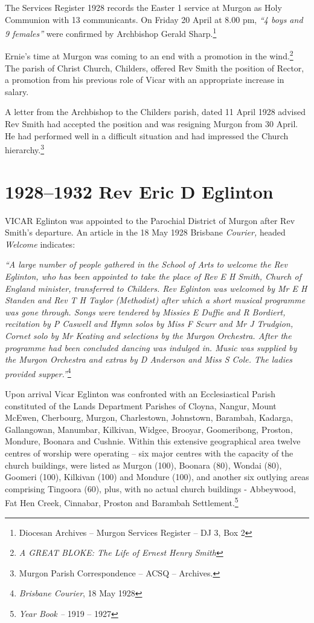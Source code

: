 The Services Register 1928 records the Easter 1 service at Murgon as Holy Communion with 13 communicants. On Friday 20 April at 8.00 pm, \emph{``4 boys and 9 females''} were confirmed by Archbishop Gerald Sharp.\footnote{Diocesan Archives -- Murgon Services Register -- DJ 3, Box 2}


Ernie's time at Murgon was coming to an end with a promotion in the wind.\footnote{\emph{A GREAT BLOKE: The Life of Ernest Henry Smith}} The parish of Christ Church, Childers, offered Rev Smith the position of Rector, a promotion from his previous role of Vicar with an appropriate increase in salary.


A letter from the Archbishop to the Childers parish, dated 11 April 1928 advised Rev Smith had accepted the position and was resigning Murgon from 30 April. He had performed well in a difficult situation and had impressed the Church hierarchy.\footnote{Murgon Parish Correspondence -- ACSQ -- Archives.}


\printendnotes[custom]
\setcounter{endnote}{0}




\chapter{1928--1932 Rev Eric D Eglinton}
\nobalance


\lettrine[lines=3]{V}{ICAR}
 Eglinton was appointed to the Parochial District of Murgon after Rev Smith's departure. An article in the 18 May 1928 Brisbane \emph{Courier,} headed \emph{Welcome} indicates:

\emph{``A large number of people gathered in the School of Arts to welcome the Rev Eglinton, who has been appointed to take the place of Rev E H Smith, Church of England minister, transferred to Childers. Rev Eglinton was welcomed by Mr E H Standen and Rev T H Taylor (Methodist) after which a short musical programme was gone through. Songs were tendered by Missies E Duffie and R Bordiert, recitation by P Caswell and Hymn solos by Miss F Scurr and Mr J Trudgion, Cornet solo by Mr Keating and selections by the Murgon Orchestra. After the programme had been concluded dancing was indulged in. Music was supplied by the Murgon Orchestra and extras by D Anderson and Miss S Cole. The ladies provided supper.''}\footnote{\emph{Brisbane Courier}, 18 May 1928}


Upon arrival Vicar Eglinton was confronted with an Ecclesiastical Parish constituted of the Lands Department Parishes of Cloyna, Nangur, Mount McEwen, Cherbourg, Murgon, Charlestown, Johnstown, Barambah, Kadarga, Gallangowan, Manumbar, Kilkivan, Widgee, Brooyar, Goomeribong, Proston, Mondure, Boonara and Cushnie. Within this extensive geographical area twelve centres of worship were operating -- six major centres with the capacity of the church buildings, were listed as Murgon (100), Boonara (80), Wondai (80), Goomeri (100), Kilkivan (100) and Mondure (100), and another six outlying areas comprising Tingoora (60), plus, with no actual church buildings - Abbeywood, Fat Hen Creek, Cinnabar, Proston and Barambah Settlement.\footnote{\emph{Year Book --} 1919 -- 1927}


